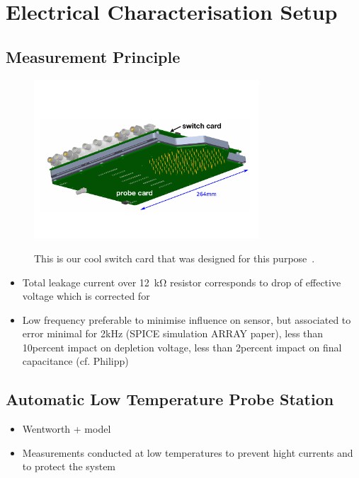 \section{Electrical Characterisation Setup}
\label{sec:setup}

\subsection{Measurement Principle}
\label{subsec:setup_principle}
\begin{figure}[h]
	\centering
	\includegraphics[width=0.75\textwidth]{figures/example_switchprobecard.pdf}
	\label{fig:switchprobecard_CAD}
	\caption{
	This is our cool switch card that was designed for this purpose~\cite{pitters:array2019}.
	}
\end{figure}

\begin{itemize}
	\item Total leakage current over \SI{12}{\kilo\ohm} resistor corresponds to drop of effective voltage which is corrected for
	\item Low frequency preferable to minimise influence on sensor, but associated to error minimal for 2kHz (SPICE simulation ARRAY paper), less than 10percent impact on depletion voltage, less than 2percent impact on final capacitance (cf. Philipp)
\end{itemize}


\subsection{Automatic Low Temperature Probe Station}
\label{subsec:setup_ALPS}

\begin{itemize}
	\item Wentworth + model
	\item Measurements conducted at low temperatures to prevent hight currents and to protect the system
\end{itemize}

